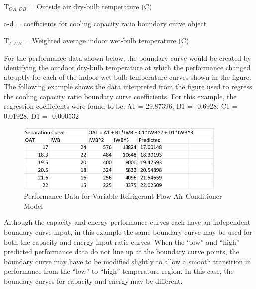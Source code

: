 T\(_{OA,DB}\) = Outside air dry-bulb temperature (C)

a-d = coefficients for cooling capacity ratio boundary curve object

T\(_{I,WB}\) = Weighted average indoor wet-bulb temperature (C)

For the performance data shown below, the boundary curve would be created by identifying the outdoor dry-bulb temperature at which the performance changed abruptly for each of the indoor wet-bulb temperature curves shown in the figure. The following example shows the data interpreted from the figure used to regress the cooling capacity ratio boundary curve coefficients. For this example, the regression coefficients were found to be: A1 = 29.87396, B1 = -0.6928, C1 = 0.01928, D1 = -0.000532

\begin{figure}[hbtp] %
\centering
\includegraphics[width=0.9\textwidth, height=0.9\textheight, keepaspectratio=true]{media/image5339.png}
\caption{Performance Data for Variable Refrigerant Flow Air Conditioner Model \label{fig:performance-data-for-variable-refrigerant-flow-air-conditioner-model}}
\end{figure}

Although the capacity and energy performance curves each have an independent boundary curve input, in this example the same boundary curve may be used for both the capacity and energy input ratio curves. When the ``low'' and ``high'' predicted performance data do not line up at the boundary curve points, the boundary curve may have to be modified slightly to allow a smooth transition in performance from the ``low'' to ``high'' temperature region. In this case, the boundary curves for capacity and energy may be different.


